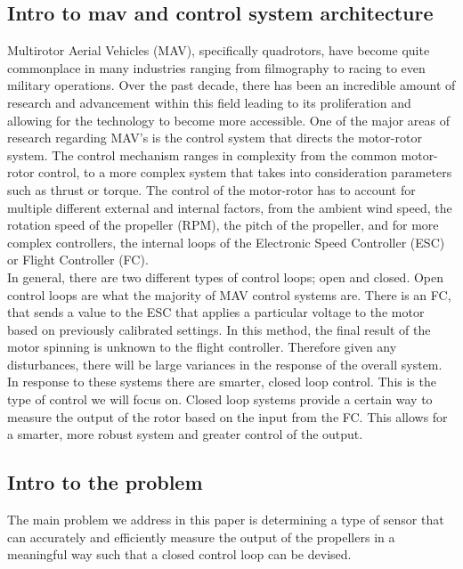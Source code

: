 \documentclass[conference]{IEEEtran}
\begin{document}
	\subsection{Intro to mav and control system architecture}
	Multirotor Aerial Vehicles (MAV), specifically quadrotors, have become quite commonplace in many industries ranging from filmography to racing to even military operations. Over the past decade, there has been an incredible amount of research and advancement within this field leading to its proliferation and allowing for the technology to become more accessible. One of the major areas of research regarding MAV's is the control system that directs the motor-rotor system. The control mechanism ranges in complexity from the common motor-rotor control, to a more complex system that takes into consideration parameters such as thrust or torque. The control of the motor-rotor has to account for multiple different external and internal factors, from the ambient wind speed, the rotation speed of the propeller (RPM), the pitch of the propeller, and for more complex controllers, the internal loops of the Electronic Speed Controller (ESC) or Flight Controller (FC). \\
	In general, there are two different types of control loops; open and closed. Open control loops are what the majority of MAV control systems are. There is an FC, that sends a value to the ESC that applies a particular voltage to the motor based on previously calibrated settings. In this method, the final result of the motor spinning is unknown to the flight controller. Therefore given any disturbances, there will be large variances in the response of the overall system. In response to these systems there are smarter, closed loop control. This is the type of control we will focus on. Closed loop systems provide a certain way to measure the output of the rotor based on the input from the FC. This allows for a smarter, more robust system and greater control of the output. \\
	\subsection{Intro to the problem}
	The main problem we address in this paper is determining a type of sensor that can accurately and efficiently measure the output of the propellers in a meaningful way such that a closed control loop can be devised.
\end{document}
